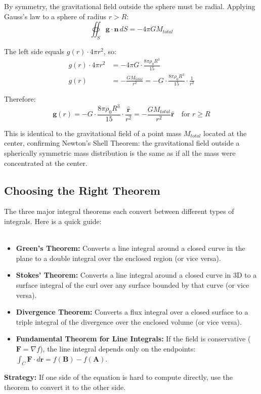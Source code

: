 \begin{example}
\begin{solution}
\begin{enumerate}
    By symmetry, the gravitational field outside the sphere must be radial. Applying Gauss's law to a sphere of radius $r > R$:
    \[
    \oiint_S \mathbf{g} \cdot \mathbf{n} \, dS = -4\pi GM_{total}
    \]
    
    The left side equals $g(r) \cdot 4\pi r^2$, so:
    \[
    \begin{aligned}
    g(r) \cdot 4\pi r^2 &= -4\pi G \cdot \frac{8\pi\rho_0R^3}{15} \\
    g(r) &= -\frac{GM_{total}}{r^2} = -G \cdot \frac{8\pi\rho_0R^3}{15} \cdot \frac{1}{r^2}
    \end{aligned}
    \]
    
    Therefore:
    \[
    \mathbf{g}(r) = -G \cdot \frac{8\pi\rho_0R^3}{15} \cdot \frac{\hat{\mathbf{r}}}{r^2} = -\frac{GM_{total}}{r^2}\hat{\mathbf{r}} \quad \text{for } r \geq R
    \]
    
    This is identical to the gravitational field of a point mass $M_{total}$ located at the center, confirming Newton's Shell Theorem: the gravitational field outside a spherically symmetric mass distribution is the same as if all the mass were concentrated at the center.
\end{enumerate}

\end{solution}
\end{example}
\exampleline

\subsection*{Choosing the Right Theorem}
\noindent The three major integral theorems each convert between different types of integrals. Here is a quick guide:\\ \\
\begin{itemize}
\item \textbf{Green's Theorem:} Converts a line integral around a closed curve in the plane to a double integral over the enclosed region (or vice versa).
\item \textbf{Stokes' Theorem:} Converts a line integral around a closed curve in 3D to a surface integral of the curl over any surface bounded by that curve (or vice versa).
\item \textbf{Divergence Theorem:} Converts a flux integral over a closed surface to a triple integral of the divergence over the enclosed volume (or vice versa).
\item \textbf{Fundamental Theorem for Line Integrals:} If the field is conservative (\(\mathbf{F} = \nabla f\)), the line integral depends only on the endpoints: \(\int_C \mathbf{F} \cdot d\mathbf{r} = f(\mathbf{B}) - f(\mathbf{A})\).
\end{itemize}
\noindent \textbf{Strategy:} If one side of the equation is hard to compute directly, use the theorem to convert it to the other side.



